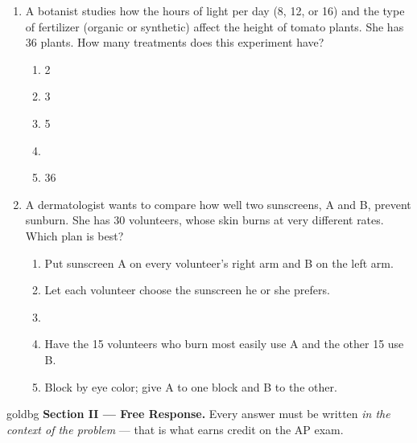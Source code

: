 \documentclass[12pt]{article}
\begin{document}
\begin{enumerate}[leftmargin=1.9em, itemsep=0.10in]

  \item A botanist studies how the hours of light per day (8, 12, or 16) and the type of
        fertilizer (organic or synthetic) affect the height of tomato plants. She has 36
        plants. How many treatments does this experiment have?
        \begin{enumerate}[label=\textbf{(\Alph*)}, leftmargin=2.2em, itemsep=1pt]
          \item 2
          \item 3
          \item 5
          \item {}
          \item 36
                \hfill{}\rule[-0.2in]{0pt}{0.48in}
        \end{enumerate}

  \item A dermatologist wants to compare how well two sunscreens, A and B, prevent sunburn.
        She has 30 volunteers, whose skin burns at very different rates. Which plan is best?
        \begin{enumerate}[label=\textbf{(\Alph*)}, leftmargin=2.2em, itemsep=1pt]
          \item Put sunscreen A on every volunteer's right arm and B on the left arm.
          \item Let each volunteer choose the sunscreen he or she prefers.
          \item {}
          \item Have the 15 volunteers who burn most easily use A and the other 15 use B.
          \item Block by eye color; give A to one block and B to the other.
                \hfill{}\rule[-0.2in]{0pt}{0.48in}
        \end{enumerate}

\end{enumerate}

\vspace{0.08in}

\boxguard[27]
\begin{headlinebox}{goldbg}
\small
\textbf{Section II --- Free Response.} Every answer must be written \emph{in the context of the
problem} --- that is what earns credit on the AP exam.
\end{headlinebox}
\end{document}
